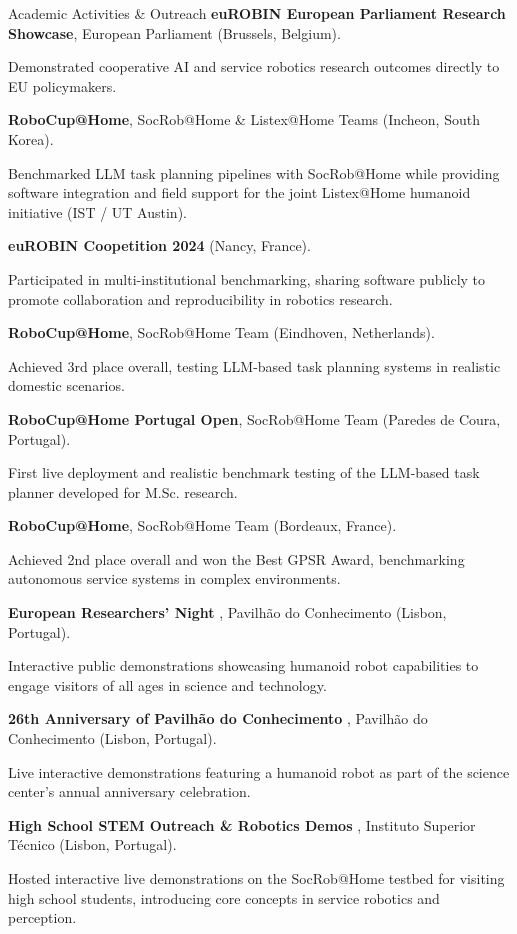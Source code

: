 \begin{rubric}{Academic Activities \& Outreach}
\entry*[Sep 2026]
	\textbf{euROBIN European Parliament Research Showcase}, European Parliament (Brussels, Belgium).
	\par
	\small Demonstrated cooperative AI and service robotics research outcomes directly to EU policymakers.

\entry*[Jul 2026]
	\textbf{RoboCup@Home}, SocRob@Home \& Listex@Home Teams (Incheon, South Korea).
	\par
	\small Benchmarked LLM task planning pipelines with SocRob@Home while providing software integration and field support for the joint Listex@Home humanoid initiative (IST / UT Austin).

\entry*[Nov 2024]
	\textbf{euROBIN Coopetition 2024} (Nancy, France).
	\par
	\small Participated in multi-institutional benchmarking, sharing software publicly to promote collaboration and reproducibility in robotics research.

\entry*[Jul 2024]
	\textbf{RoboCup@Home}, SocRob@Home Team (Eindhoven, Netherlands).
	\par
	\small Achieved 3rd place overall, testing LLM-based task planning systems in realistic domestic scenarios.

\entry*[May 2024]
	\textbf{RoboCup@Home Portugal Open}, SocRob@Home Team (Paredes de Coura, Portugal).
	\par
	\small First live deployment and realistic benchmark testing of the LLM-based task planner developed for M.Sc. research.

\entry*[Jul 2023]
	\textbf{RoboCup@Home}, SocRob@Home Team (Bordeaux, France).
	\par
	\small Achieved 2nd place overall and won the Best GPSR Award, benchmarking autonomous service systems in complex environments.


\entry*[Sep 2025]
	\textbf{European Researchers' Night }, Pavilhão do Conhecimento (Lisbon, Portugal).
	\par
	\small Interactive public demonstrations showcasing humanoid robot capabilities to engage visitors of all ages in science and technology.

\entry*[Jul 2025]
	\textbf{26th Anniversary of Pavilhão do Conhecimento }, Pavilhão do Conhecimento (Lisbon, Portugal).
	\par
	\small Live interactive demonstrations featuring a humanoid robot as part of the science center's annual anniversary celebration.

\entry*[2024 -- Present]
	\textbf{High School STEM Outreach \& Robotics Demos }, Instituto Superior Técnico (Lisbon, Portugal).
	\par
	\small Hosted interactive live demonstrations on the SocRob@Home testbed for visiting high school students, introducing core concepts in service robotics and perception.


\end{rubric}